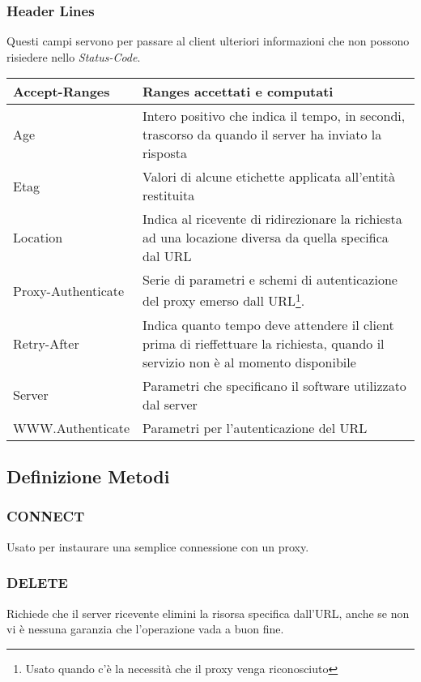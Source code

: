 \documentclass[a4paper,11pt]{article}
\begin{document}
\subsubsection{Header Lines}
Questi campi servono per passare al client ulteriori informazioni che non possono risiedere nello \textit{Status-Code}.\bigbreak
\begin{center}
    \begin{tabular}{l|p{}}
        Accept-Ranges & Ranges accettati e computati\\
        \hline
        Age & Intero positivo che indica il tempo, in secondi, trascorso da quando il server ha inviato la risposta\\  
        \hline
        Etag & Valori di alcune etichette applicata all’entità restituita\\
        \hline
        Location & Indica al ricevente di ridirezionare la richiesta ad una locazione diversa da quella specifica dal URL\\
        \hline
        Proxy-Authenticate & Serie di parametri e schemi di autenticazione del proxy emerso dall URL\footnote{Usato quando c’è la necessità che il proxy venga riconosciuto}.\\
        \hline
        Retry-After & Indica quanto tempo deve attendere il client prima di rieffettuare la richiesta, quando il servizio non è al momento disponibile\\
        \hline
        Server & Parametri che specificano il software utilizzato dal server\\
        \hline
        WWW.Authenticate & Parametri per l’autenticazione del URL
    \end{tabular}
\end{center}
\subsection{Definizione Metodi}
\subsubsection{CONNECT}
Usato per instaurare una semplice connessione con un proxy.
\subsubsection{DELETE}
Richiede che il server ricevente elimini la risorsa specifica dall’URL, anche se non vi è nessuna garanzia che l’operazione vada a buon fine.
\end{document}

